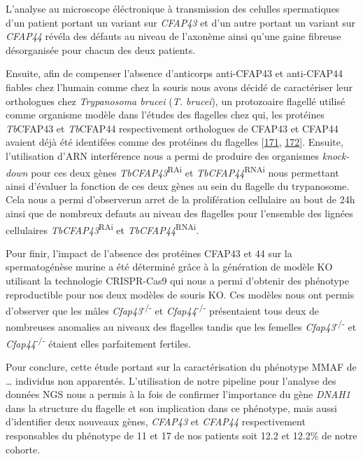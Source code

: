 \documentclass[12pt,twoside]{reedthesis}
\theoremstyle{definition}
\theoremstyle{definition}
\theoremstyle{remark}
\begin{document}
  L'analyse au microscope éléctronique à transmission des celulles
  spermatiques d'un patient portant un variant sur \emph{CFAP43} et d'un
  autre portant un variant sur \emph{CFAP44} révéla des défauts au niveau
  de l'axonème ainsi qu'une gaine fibreuse désorganisée pour chacun des
  deux patients.
  
  Ensuite, afin de compenser l'absence d'anticorps anti-CFAP43 et
  anti-CFAP44 fiables chez l'humain comme chez la souris nous avons décidé
  de caractériser leur orthologues chez \emph{Trypanosoma brucei}
  (\emph{T. brucei}), un protozoaire flagellé utilisé comme organisme
  modèle dans l'études des flagelles chez qui, les protéines
  \emph{Tb}CFAP43 et \emph{Tb}CFAP44 respectivement orthologues de CFAP43
  et CFAP44 avaient déjà été identifées comme des protéines du flagelles
  {[}\protect\hyperlink{ref-Broadhead2006}{171},
  \protect\hyperlink{ref-Subota2014}{172}{]}. Ensuite, l'utilisation d'ARN
  interférence nous a permi de produire des organismes \emph{knock-down}
  pour ces deux gènes \emph{TbCFAP43}\textsuperscript{RAi} et
  \emph{TbCFAP44}\textsuperscript{RNAi} nous permettant ainsi d'évaluer la
  fonction de ces deux gènes au sein du flagelle du trypanosome. Cela nous
  a permi d'observerun arret de la prolifération cellulaire au bout de 24h
  ainsi que de nombreux defauts au niveau des flagelles pour l'ensemble
  des lignées cellulaires \emph{TbCFAP43}\textsuperscript{RAi} et
  \emph{TbCFAP44}\textsuperscript{RNAi}.
  
  Pour finir, l'impact de l'absence des protéines CFAP43 et 44 sur la
  spermatogénèse murine a été déterminé grâce à la génération de modèle KO
  utilisant la technologie CRISPR-Cas9 qui nous a permi d'obtenir des
  phénotype reproductible pour nos deux modèles de souris KO. Ces modèles
  nous ont permis d'observer que les mâles
  \emph{Cfap43}\textsuperscript{-/-} et \emph{Cfap44}\textsuperscript{-/-}
  présentaient tous deux de nombreuses anomalies au niveaux des flagelles
  tandis que les femelles \emph{Cfap43}\textsuperscript{-/-} et
  \emph{Cfap44}\textsuperscript{-/-} étaient elles parfaitement fertiles.
  
  Pour conclure, cette étude portant sur la caractérisation du phénotype
  MMAF de \ldots{} individus non apparentés. L'utilisation de notre
  pipeline pour l'analyse des données NGS nous a permis à la fois de
  confirmer l'importance du gène \emph{DNAH1} dans la structure du
  flagelle et son implication dans ce phénotype, mais aussi d'identifier
  deux nouveaux gènes, \emph{CFAP43} et \emph{CFAP44} respectivement
  responsables du phénotype de 11 et 17 de nos patients soit 12.2 et
  12.2\% de notre cohorte.
  
\end{document}
